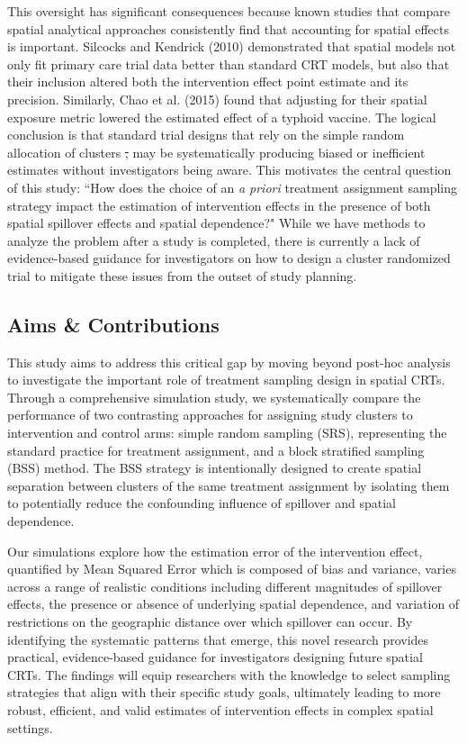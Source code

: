 \documentclass{article}[11pt]
\makeatletter
\providecommand{\DIFdeltex}[1]{{\protect\color{red}\sout{#1}}} %
\providecommand{\DIFdelbegin}{} %
\providecommand{\DIFdelend}{} %
\providecommand{\DIFdel}[1]{\texorpdfstring{\DIFdeltex{#1}}{}} %
\providecommand{\DIFscaledelfig}{0.5}
\newlength{\DIFdelgraphicswidth} %
\newlength{\DIFdelgraphicsheight} %
\providecommand{\DIFdelincludegraphics}[2][]{%
\sbox{\DIFdelgraphicsbox}{\DIFOincludegraphics[#1]{#2}}%
\settoboxwidth{\DIFdelgraphicswidth}{\DIFdelgraphicsbox} %
\settoboxtotalheight{\DIFdelgraphicsheight}{\DIFdelgraphicsbox} %
\scalebox{\DIFscaledelfig}{%
\parbox[b]{\DIFdelgraphicswidth}{\usebox{\DIFdelgraphicsbox}\\[-\baselineskip] \rule{\DIFdelgraphicswidth}{0em}}\llap{\resizebox{\DIFdelgraphicswidth}{\DIFdelgraphicsheight}{%
\setlength{\unitlength}{\DIFdelgraphicswidth}%
\begin{picture}(1,1)%
\thicklines\linethickness{2pt} %
{\color[rgb]{1,0,0}\put(0,0){\framebox(1,1){}}}%
{\color[rgb]{1,0,0}\put(0,0){\line( 1,1){1}}}%
{\color[rgb]{1,0,0}\put(0,1){\line(1,-1){1}}}%
\end{picture}%
}\hspace*{3pt}}} %
} %
\DeclareRobustCommand{\DIFdelbegin}{\DIFOdelbegin \let\includegraphics\DIFdelincludegraphics} %
\DeclareRobustCommand{\DIFdelend}{\DIFOaddend \let\includegraphics\DIFOincludegraphics} %
\let\sout@orig\sout %
\renewcommand{\sout}[1]{\ifmmode\text{\sout@orig{\ensuremath{#1}}}\else\sout@orig{#1}\fi} %
\makeatother
\begin{document}
This oversight has significant consequences because known studies that compare spatial analytical approaches consistently find that accounting for spatial effects is important. Silcocks and Kendrick (2010) demonstrated that spatial models not only fit primary care trial data better than standard CRT models, but also that their inclusion altered both the intervention effect point estimate and its precision\cite{silcocks_spatial_2010}. Similarly, Chao et al. (2015) found that adjusting for their spatial exposure metric lowered the estimated effect of a typhoid vaccine\cite{chao_contribution_2015}. The logical conclusion is that standard trial designs that rely on the simple random allocation of clusters \DIFdelbegin \DIFdel{, }\DIFdelend may be systematically producing biased or inefficient estimates without investigators being aware. This motivates the central question of this study: ``How does the choice of an \textit{a priori} treatment assignment sampling strategy impact the estimation of intervention effects in the presence of both spatial spillover effects and spatial dependence?" While we have methods to analyze the problem after a study is completed, there is currently a lack of evidence-based guidance for investigators on how to design a cluster randomized trial to mitigate these issues from the outset of study planning.

\subsection{Aims \& Contributions}

This study aims to address this critical gap by moving beyond post-hoc analysis to investigate the important role of treatment sampling design in spatial CRTs. Through a comprehensive simulation study, we systematically compare the performance of two contrasting approaches for assigning study clusters to intervention and control arms: simple random sampling (SRS), representing the standard practice for treatment assignment, and a block stratified sampling (BSS) method. The BSS strategy is intentionally designed to create spatial separation between clusters of the same treatment assignment by isolating them to potentially reduce the confounding influence of spillover and spatial dependence.

Our simulations explore how the estimation error of the intervention effect, quantified by Mean Squared Error which is composed of bias and variance, varies across a range of realistic conditions including different magnitudes of spillover effects, the presence or absence of underlying spatial dependence, and variation of restrictions on the geographic distance over which spillover can occur. By identifying the systematic patterns that emerge, this novel research provides practical, evidence-based guidance for investigators designing future spatial CRTs. The findings will equip researchers with the knowledge to select sampling strategies that align with their specific study goals, ultimately leading to more robust, efficient, and valid estimates of intervention effects in complex spatial settings.
\end{document}
